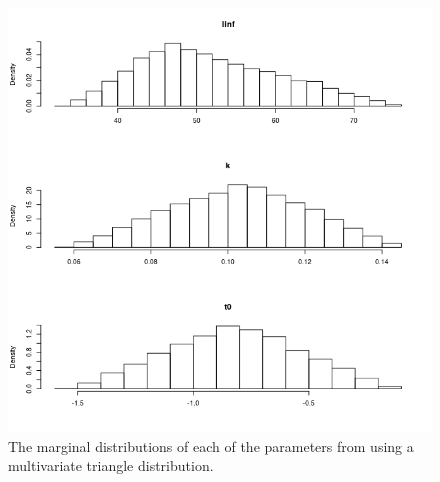 \documentclass[a4paper,english,10pt]{article}\usepackage[]{graphicx}\usepackage[]{color}
\newenvironment{knitrout}{}{} %
\begin{document}
\begin{knitrout}
\color{fgcolor}\begin{figure}[H]

{\centering \includegraphics[width=.9\linewidth]{figure/plot_tri_params-1} 

}

\caption[The marginal distributions of each of the parameters from using a multivariate triangle distribution]{The marginal distributions of each of the parameters from using a multivariate triangle distribution.}\label{fig:plot_tri_params}
\end{figure}


\end{knitrout}
\end{document}
